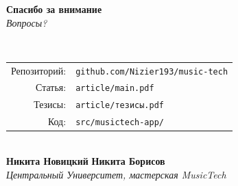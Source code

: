 ﻿%
\begin{frame}[plain]
  \vfill
  \begin{center}
    {\Huge\bfseries Спасибо за внимание}\\[1em]
    {\large\itshape Вопросы?}\\[1.5em]

    \\[1em]

    \small
    \begin{tabular}{rl}
      Репозиторий: & \texttt{github.com/Nizier193/music-tech}\\[0.2em]
      Статья: & \texttt{article/main.pdf}\\[0.2em]
      Тезисы: & \texttt{article/тезисы.pdf}\\[0.2em]
      Код: & \texttt{src/musictech-app/}
    \end{tabular}\\[1.5em]

    \textbf{Никита Новицкий} \quad\textbar\quad
    \textbf{Никита Борисов}\\
    {\itshape Центральный Университет, мастерская MusicTech}
  \end{center}
  \vfill
\end{frame}
